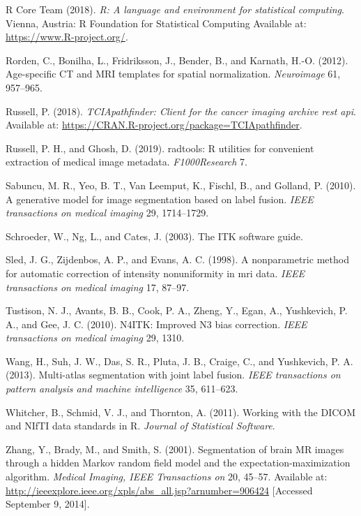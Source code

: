 \documentclass[utf8]{frontiersSCNS}
\begin{document}
\leavevmode\hypertarget{ref-R}{}%
R Core Team (2018). \emph{R: A language and environment for statistical computing}. Vienna, Austria: R Foundation for Statistical Computing Available at: \url{https://www.R-project.org/}.

\leavevmode\hypertarget{ref-rorden2012age}{}%
Rorden, C., Bonilha, L., Fridriksson, J., Bender, B., and Karnath, H.-O. (2012). Age-specific CT and MRI templates for spatial normalization. \emph{Neuroimage} 61, 957--965.

\leavevmode\hypertarget{ref-TCIApathfinder}{}%
Russell, P. (2018). \emph{TCIApathfinder: Client for the cancer imaging archive rest api}. Available at: \url{https://CRAN.R-project.org/package=TCIApathfinder}.

\leavevmode\hypertarget{ref-radtools}{}%
Russell, P. H., and Ghosh, D. (2019). radtools: R utilities for convenient extraction of medical image metadata. \emph{F1000Research} 7.

\leavevmode\hypertarget{ref-sabuncu2010generative}{}%
Sabuncu, M. R., Yeo, B. T., Van Leemput, K., Fischl, B., and Golland, P. (2010). A generative model for image segmentation based on label fusion. \emph{IEEE transactions on medical imaging} 29, 1714--1729.

\leavevmode\hypertarget{ref-itk}{}%
Schroeder, W., Ng, L., and Cates, J. (2003). The ITK software guide.

\leavevmode\hypertarget{ref-sled1998nonparametric}{}%
Sled, J. G., Zijdenbos, A. P., and Evans, A. C. (1998). A nonparametric method for automatic correction of intensity nonuniformity in mri data. \emph{IEEE transactions on medical imaging} 17, 87--97.

\leavevmode\hypertarget{ref-n4}{}%
Tustison, N. J., Avants, B. B., Cook, P. A., Zheng, Y., Egan, A., Yushkevich, P. A., and Gee, J. C. (2010). N4ITK: Improved N3 bias correction. \emph{IEEE transactions on medical imaging} 29, 1310.

\leavevmode\hypertarget{ref-malf}{}%
Wang, H., Suh, J. W., Das, S. R., Pluta, J. B., Craige, C., and Yushkevich, P. A. (2013). Multi-atlas segmentation with joint label fusion. \emph{IEEE transactions on pattern analysis and machine intelligence} 35, 611--623.

\leavevmode\hypertarget{ref-orodicom}{}%
Whitcher, B., Schmid, V. J., and Thornton, A. (2011). Working with the DICOM and NIfTI data standards in R. \emph{Journal of Statistical Software}.

\leavevmode\hypertarget{ref-zhang_segmentation_2001}{}%
Zhang, Y., Brady, M., and Smith, S. (2001). Segmentation of brain MR images through a hidden Markov random field model and the expectation-maximization algorithm. \emph{Medical Imaging, IEEE Transactions on} 20, 45--57. Available at: \url{http://ieeexplore.ieee.org/xpls/abs_all.jsp?arnumber=906424} {[}Accessed September 9, 2014{]}.
\end{document}
